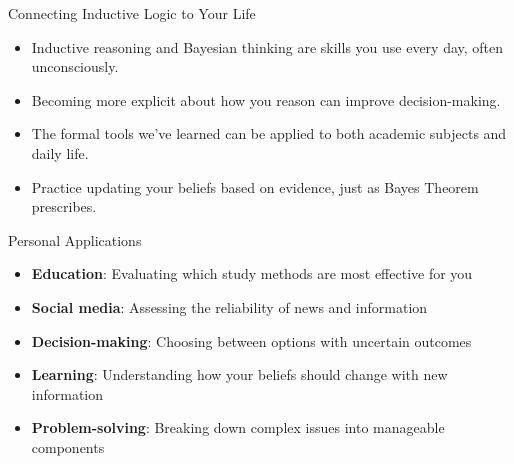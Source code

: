 \documentclass{beamer}
\begin{document}
	\begin{frame}{Connecting Inductive Logic to Your Life}
		\begin{itemize}
			\item Inductive reasoning and Bayesian thinking are skills you use every day, often unconsciously.
			\item Becoming more explicit about how you reason can improve decision-making.
			\item The formal tools we've learned can be applied to both academic subjects and daily life.
			\item Practice updating your beliefs based on evidence, just as Bayes Theorem prescribes.
		\end{itemize}
		
		\begin{exampleblock}{Personal Applications}
			\scriptsize
			\begin{itemize}
				\item \textbf{Education}: Evaluating which study methods are most effective for you
				\item \textbf{Social media}: Assessing the reliability of news and information
				\item \textbf{Decision-making}: Choosing between options with uncertain outcomes
				\item \textbf{Learning}: Understanding how your beliefs should change with new information
				\item \textbf{Problem-solving}: Breaking down complex issues into manageable components
			\end{itemize}
		\end{exampleblock}
	\end{frame}
	
\end{document}
